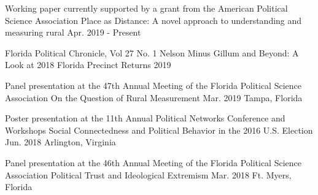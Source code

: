 

\begin{cventries}


\cventry
  {Working paper currently supported by a grant from the American Political Science Association} %
  {Place as Distance: A novel approach to understanding and measuring rural} %
  {Apr. 2019 - Present} %
  {} %
  {}

\vspace{-.25cm}
\cventry
  {Florida Political Chronicle, Vol 27 No. 1} %
  {Nelson Minus Gillum and Beyond: A Look at 2018 Florida Precinct Returns} %
  {2019} %
  {} %
  {}
  
\vspace{-.25cm}
\cventry
  {Panel presentation at the 47th Annual Meeting of the Florida Political Science Association} %
  {On the Question of Rural Measurement} %
  {Mar. 2019} %
  {Tampa, Florida} %
  {}

\vspace{-.25cm}
\cventry
  {Poster presentation at the 11th Annual Political Networks Conference and Workshops} %
  {Social Connectedness and Political Behavior in the 2016 U.S. Election} %
  {Jun. 2018} %
  {Arlington, Virginia} %
  {}

\vspace{-.25cm}
\cventry
  {Panel presentation at the 46th Annual Meeting of the Florida Political Science Association} %
  {Political Trust and Ideological Extremism} %
  {Mar. 2018} %
  {Ft. Myers, Florida} %
  {}

\vspace{-.25cm}


\end{cventries}

